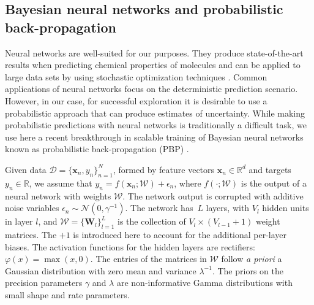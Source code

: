 \subsection{Bayesian neural networks and probabilistic back-propagation}

Neural networks are well-suited for our purposes. They produce state-of-the-art results when predicting chemical properties of molecules \cite{Ma_2015,Mayr_2016,ramsundar2015massively} and can be applied to large data sets by using stochastic optimization techniques \cite{bousquet2008tradeoffs}. Common applications of neural networks focus on the deterministic prediction scenario. However, in our case, for successful exploration it is desirable to use a probabilistic approach that can produce estimates of uncertainty. While making probabilistic predictions with neural networks is traditionally a difficult task, we use here a recent breakthrough in scalable training of Bayesian neural networks known as probabilistic back-propagation (PBP) \cite{hernandez2015probabilistic}. 

Given data ${\mathcal{D} = \{\mathbf{x}_n, y_n \}_{n=1}^N}$, formed by feature vectors $\mathbf{x}_n \in \mathbb{R}^d$ and targets ${y_n \in \mathbb{R}}$, we assume that $y_n = f(\mathbf{x}_n;\mathcal{W}) + \epsilon_n$, where $f(\cdot ;\mathcal{W})$ is the output of a neural network with weights $\mathcal{W}$. The network output is corrupted with additive noise variables $\epsilon_n \sim \mathcal{N}(0,\gamma^{-1})$. The network has~$L$ layers, with $V_l$ hidden units in layer $l$, and $\mathcal{W} = \{ \mathbf{W}_l \}_{l=1}^L$ is the collection of $V_l \times (V_{l-1}+1)$ weight matrices. The $+1$ is introduced here to account for the additional per-layer biases. The activation functions for the hidden layers are rectifiers: $\varphi(x) = \max(x,0)$. The entries of the matrices in $\mathcal{W}$ follow \emph{a priori} a Gaussian distribution with zero mean and variance $\lambda^{-1}$. The priors on the precision parameters $\gamma$ and $\lambda$ are non-informative Gamma distributions with small shape and rate parameters.

